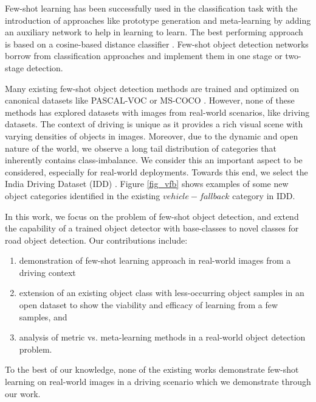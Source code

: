 \documentclass[letterpaper]{article} %
\begin{document}
Few-shot learning has been successfully used in the classification task \cite{matching-net,protonet,maml} with the introduction of approaches like prototype generation and meta-learning by adding an auxiliary network to help in learning to learn.  The best performing approach is based on a cosine-based distance classifier \cite{matching-net}. Few-shot object detection networks borrow from classification approaches and implement them in one stage \cite{reweight} or two-stage \cite{metarcnn,addfeat,fsdet} detection.

Many existing few-shot object detection methods are trained and optimized on canonical datasets like PASCAL-VOC \cite{voc} or MS-COCO \cite{coco}. However, none of these methods has explored datasets with  images from real-world scenarios, like driving datasets. The context of driving is unique as it provides a rich visual scene with varying densities of objects in images. Moreover, due to the dynamic and open nature of the world, we observe a long tail distribution of categories that inherently contains class-imbalance. We consider this an important aspect to be considered, especially for real-world deployments. Towards this end, we select the India Driving Dataset (IDD) \cite{idd}. Figure \ref{fig_vfb} shows examples of some new object categories identified in the existing $vehicle-fallback$ category in IDD.

In this work, we focus on the problem of few-shot object detection, and extend the capability of a trained object detector with base-classes to novel classes for road object detection. Our contributions include:
\begin{enumerate}
\item demonstration of few-shot learning approach in real-world images from a driving context
\item extension of an existing object class with less-occurring object samples in an open dataset to  show the viability and efficacy of learning from a few samples, and
\item analysis of metric vs. meta-learning methods in a real-world object detection problem.
\end{enumerate}

To the best of our knowledge, none of the existing works demonstrate few-shot learning on real-world images in a driving scenario which we demonstrate through our work.

\end{document}
